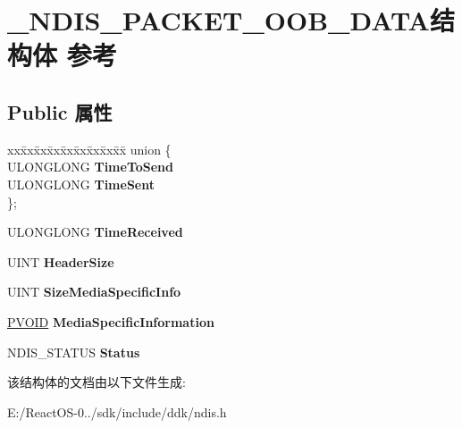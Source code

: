 \hypertarget{struct___n_d_i_s___p_a_c_k_e_t___o_o_b___d_a_t_a}{}\section{\+\_\+\+N\+D\+I\+S\+\_\+\+P\+A\+C\+K\+E\+T\+\_\+\+O\+O\+B\+\_\+\+D\+A\+T\+A结构体 参考}
\label{struct___n_d_i_s___p_a_c_k_e_t___o_o_b___d_a_t_a}
\subsection*{Public 属性}
\begin{DoxyCompactItemize}
\item 
\mbox{\label{struct___n_d_i_s___p_a_c_k_e_t___o_o_b___d_a_t_a_ac02c3ce1fd4870ac944dd5361999b3ac}} 
\begin{tabbing}
xx\=xx\=xx\=xx\=xx\=xx\=xx\=xx\=xx\=\kill
union \{\\
\>ULONGLONG {\bfseries TimeToSend}\\
\>ULONGLONG {\bfseries TimeSent}\\
\}; \\

\end{tabbing}\item 
\mbox{\label{struct___n_d_i_s___p_a_c_k_e_t___o_o_b___d_a_t_a_a4a6c81439b3451d71b07131a155d9036}} 
U\+L\+O\+N\+G\+L\+O\+NG {\bfseries Time\+Received}
\item 
\mbox{\label{struct___n_d_i_s___p_a_c_k_e_t___o_o_b___d_a_t_a_a083642bea5f20d7fba6d51905d52ff59}} 
U\+I\+NT {\bfseries Header\+Size}
\item 
\mbox{\label{struct___n_d_i_s___p_a_c_k_e_t___o_o_b___d_a_t_a_aa88ddfe2454e9bb83e382b10a729e138}} 
U\+I\+NT {\bfseries Size\+Media\+Specific\+Info}
\item 
\mbox{\label{struct___n_d_i_s___p_a_c_k_e_t___o_o_b___d_a_t_a_a695bdb3ddc91a6e02961fec53be8c8b5}} 
\hyperlink{interfacevoid}{P\+V\+O\+ID} {\bfseries Media\+Specific\+Information}
\item 
\mbox{\label{struct___n_d_i_s___p_a_c_k_e_t___o_o_b___d_a_t_a_ae51166284be144a7e7fcf40c52c6be54}} 
N\+D\+I\+S\+\_\+\+S\+T\+A\+T\+US {\bfseries Status}
\end{DoxyCompactItemize}


该结构体的文档由以下文件生成\+:\begin{DoxyCompactItemize}
\item 
E\+:/\+React\+O\+S-\/0../sdk/include/ddk/ndis.\+h\end{DoxyCompactItemize}
